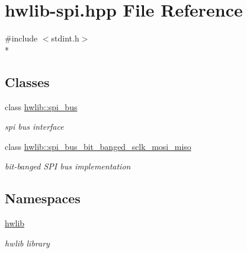\hypertarget{hwlib-spi_8hpp}{}\section{hwlib-\/spi.hpp File Reference}
\label{hwlib-spi_8hpp}
{\ttfamily \#include $<$stdint.\+h$>$}\\*
\subsection*{Classes}
\begin{DoxyCompactItemize}
\item 
class \hyperlink{classhwlib_1_1spi__bus}{hwlib\+::spi\+\_\+bus}
\begin{DoxyCompactList}\small\item\em spi bus interface \end{DoxyCompactList}\item 
class \hyperlink{classhwlib_1_1spi__bus__bit__banged__sclk__mosi__miso}{hwlib\+::spi\+\_\+bus\+\_\+bit\+\_\+banged\+\_\+sclk\+\_\+mosi\+\_\+miso}
\begin{DoxyCompactList}\small\item\em bit-\/banged S\+PI bus implementation \end{DoxyCompactList}\end{DoxyCompactItemize}
\subsection*{Namespaces}
\begin{DoxyCompactItemize}
\item 
 \hyperlink{namespacehwlib}{hwlib}
\begin{DoxyCompactList}\small\item\em hwlib library \end{DoxyCompactList}\end{DoxyCompactItemize}
